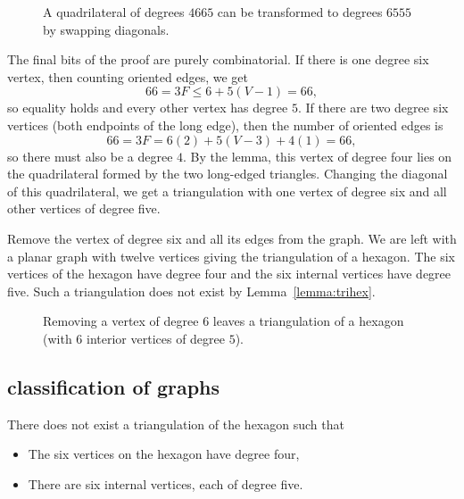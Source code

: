 
\begin{figure}[htb]
  \centering
  \caption{A quadrilateral of degrees $4665$ can
be transformed to degrees $6555$ by swapping
diagonals.}
  \label{fig:13:D}
\end{figure}

The final bits of the proof are purely combinatorial. If there is
one degree six vertex, then counting oriented edges, we get
    $$66 = 3 F \le 6 + 5(V-1) = 66,$$
so equality holds and every other vertex has degree $5$.  If there
are two degree six vertices (both endpoints of the long edge),
then the number of oriented edges is
    $$
    66 = 3 F = 6 (2) + 5 (V-3) + 4 (1) = 66,
    $$
so there must also be a degree $4$.  By the lemma, this vertex of
degree four lies on the quadrilateral formed by the two long-edged
triangles.  Changing the diagonal of this quadrilateral, we get a
triangulation with one vertex of degree six and all other vertices
of degree five.

Remove the vertex of degree six and all its edges from the graph.
We are left with a planar graph with twelve vertices giving the
triangulation of a hexagon.  The six vertices of the hexagon have
degree four and the six internal vertices have degree five.  Such
a triangulation does not exist by Lemma~\ref{lemma:trihex}.

\begin{figure}[htb]
  \centering
  \caption{Removing a vertex of degree $6$ leaves a
triangulation of a hexagon (with $6$ interior vertices of degree
$5$).}
  \label{fig:13:E}
\end{figure}

\subsection{classification of graphs}

\begin{lemma}\label{lemma:trihex}  
There does not exist a  triangulation of the hexagon such that
    \begin{itemize}
     \item   The six vertices on the hexagon have degree four,
     \item   There are six internal vertices, each of degree five.
    \end{itemize}
\end{lemma}

